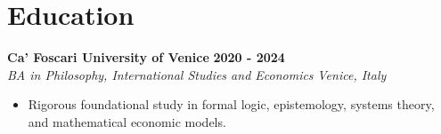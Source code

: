 \documentclass[10pt,a4paper]{article}
\newcommand{\role}[4]{%
  \textbf{#1} \hfill \textbf{#2}\\[1pt]%
  \textit{#3} \hfill \textit{#4}\\[2pt]%
}
\begin{document}
\section{Education}
\role{Ca' Foscari University of Venice}{2020 - 2024}{BA in Philosophy, International Studies and Economics}{Venice, Italy}
\begin{itemize}
  \item Rigorous foundational study in formal logic, epistemology, systems theory, and mathematical economic models.
\end{itemize}
\end{document}
